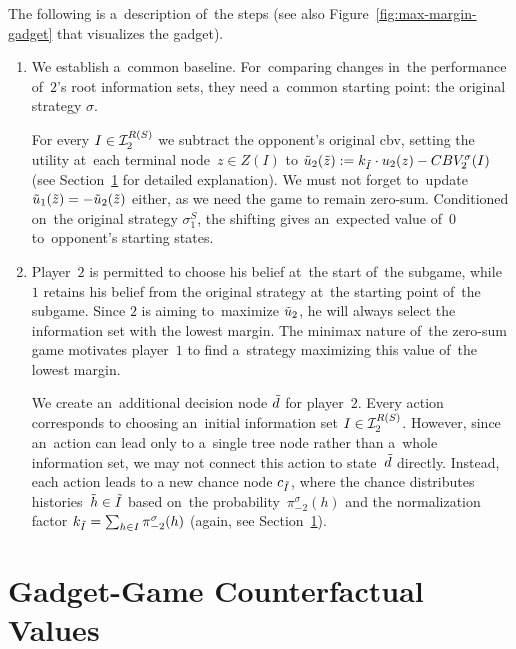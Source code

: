 The following is a~description of~the steps (see also Figure~\ref{fig:max-margin-gadget} that visualizes the gadget).
\begin{enumerate}
  \item We establish a~common baseline.
    For~comparing changes in~the performance of~$2$'s root information sets, they need a~common starting point:
    the original strategy $\sigma$.

    For every $I \in \mathcal{I}_2^{R(S)}$ we subtract the opponent's original \acrlong{cbv}, setting the utility at~each terminal node~$z \in Z(I)$ to $\tilde{u}_2(\tilde{z}) := k_{\tilde{I}} \cdot u_2(z) - CBV_2^{\sigma}(I)$ (see Section~\ref{sec:cfval-shifts} for detailed explanation).
    We must not forget to~update $\tilde{u}_1(\tilde{z}) = -\tilde{u}_2(\tilde{z})$ either, as we need the game to remain zero-sum.
    Conditioned on~the original strategy $\sigma_1^S$, the shifting gives an~expected value of~$0$ to~opponent's starting states.

  \item Player~$2$ is permitted to choose his belief at~the start of~the subgame, while $1$ retains his belief from the original strategy at~the starting point of~the subgame.
    Since $2$ is aiming to~maximize $\tilde{u}_2$, he will always select the information set with the lowest margin.
    The minimax nature of~the zero-sum game motivates player~$1$ to find a~strategy maximizing this value of~the lowest margin.

    We create an~additional decision node $\tilde{d}$ for player~$2$.
    Every action corresponds to choosing an~initial information set $I\in \mathcal{I}_2^{R(S)}$.
    However, since an~action can lead only to a~single tree node rather than a~whole information set, we may not connect this action to state~$\tilde{d}$ directly.
    Instead, each action leads to a new chance node $c_{\tilde{I}}$, where the chance distributes histories~$\tilde{h} \in \tilde{I}$ based on~the probability~$\pi_{-2}^\sigma (h)$ and the normalization factor $k_{\tilde{I}} = \sum_{ h \in I} \pi_{-2}^\sigma(h)$ (again, see Section~\ref{sec:cfval-shifts}).
\end{enumerate}

\section{Gadget-Game Counterfactual Values}
\label{sec:cfval-shifts}
%

